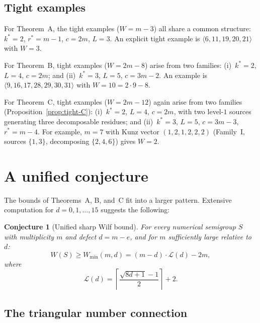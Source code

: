 \documentclass[11pt]{amsart}
\newtheorem{conjecture}[theorem]{Conjecture}
\theoremstyle{definition}
\theoremstyle{remark}
\begin{document}
\subsection{Tight examples}

For Theorem~A, the tight examples ($W = m - 3$) all share a common structure:
$k^* = 2$, $r^* = m - 1$, $c = 2m$, $L = 3$.  An explicit tight example is
$\langle 6, 11, 19, 20, 21 \rangle$ with $W = 3$.

For Theorem~B, tight examples ($W = 2m - 8$) arise from two families:
(i)~$k^* = 2$, $L = 4$, $c = 2m$; and (ii)~$k^* = 3$, $L = 5$, $c = 3m - 2$.
An example is $\langle 9, 16, 17, 28, 29, 30, 31 \rangle$ with $W = 10 = 2 \cdot 9 - 8$.

For Theorem~C, tight examples ($W = 2m - 12$) again arise from two families
(Proposition~\ref{prop:tight-C}):
(i)~$k^* = 2$, $L = 4$, $c = 2m$, with two level-$1$ sources generating
three decomposable residues;
and (ii)~$k^* = 3$, $L = 5$, $c = 3m - 3$, $r^* = m - 4$.
For example, $m = 7$ with Kunz vector $(1, 2, 1, 2, 2, 2)$
(Family~I, sources $\{1, 3\}$, decomposing $\{2, 4, 6\}$) gives $W = 2$.

\section{A unified conjecture}\label{sec:conjecture}

The bounds of Theorems~A, B, and~C fit into a larger pattern.
Extensive computation for $d = 0, 1, \ldots, 15$ suggests the following:

\begin{conjecture}[Unified sharp Wilf bound]\label{conj:unified}
For every numerical semigroup $S$ with multiplicity $m$ and defect $d = m - e$,
and for $m$ sufficiently large relative to $d$:
\begin{equation}\label{eq:unified}
  W(S) \ge W_{\min}(m, d) = (m - d) \cdot \mathcal{L}(d) - 2m,
\end{equation}
where
\begin{equation}\label{eq:L-function}
  \mathcal{L}(d) = \left\lceil \frac{\sqrt{8d + 1} - 1}{2} \right\rceil + 2.
\end{equation}
\end{conjecture}

\subsection{The triangular number connection}
\end{document}
